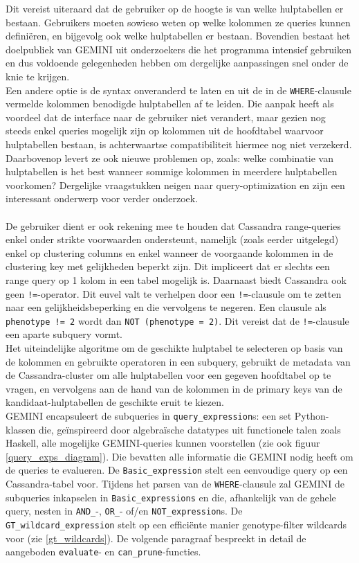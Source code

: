 Dit vereist uiteraard dat de gebruiker op de hoogte is van welke hulptabellen er bestaan. Gebruikers moeten sowieso weten op welke kolommen ze queries kunnen defini\"eren, en bijgevolg ook welke hulptabellen er bestaan. Bovendien bestaat het doelpubliek van GEMINI uit onderzoekers die het programma intensief gebruiken en dus voldoende gelegenheden hebben om dergelijke aanpassingen snel onder de knie te krijgen.\\
Een andere optie is de syntax onveranderd te laten en uit de in de \texttt{WHERE}-clausule vermelde kolommen benodigde hulptabellen af te leiden. Die aanpak heeft als voordeel dat de interface naar de gebruiker niet verandert, maar gezien nog steeds enkel queries mogelijk zijn op kolommen uit de hoofdtabel waarvoor hulptabellen bestaan, is achterwaartse compatibiliteit hiermee nog niet verzekerd. Daarbovenop levert ze ook nieuwe problemen op, zoals: welke combinatie van hulptabellen is het best wanneer sommige kolommen in meerdere hulptabellen voorkomen? Dergelijke vraagstukken neigen naar query-optimization en zijn een interessant onderwerp voor verder onderzoek.\\\\
De gebruiker dient er ook rekening mee te houden dat Cassandra range-queries enkel onder strikte voorwaarden ondersteunt, namelijk (zoals eerder uitgelegd) enkel op clustering columns en enkel wanneer de voorgaande kolommen in de clustering key met gelijkheden beperkt zijn. Dit impliceert dat er slechts een range query op 1 kolom in een tabel mogelijk is. Daarnaast biedt Cassandra ook geen \texttt{!=}-operator. Dit euvel valt te verhelpen door een \texttt{!=}-clausule om te zetten naar een gelijkheidsbeperking en die vervolgens te negeren. Een clausule als \texttt{phenotype != 2} wordt dan \texttt{NOT (phenotype = 2)}. Dit vereist dat de \texttt{!=}-clausule een aparte subquery vormt.\\

Het uiteindelijke algoritme om de geschikte hulptabel te selecteren op basis van de kolommen en gebruikte operatoren in een subquery, gebruikt de metadata van de Cassandra-cluster om alle hulptabellen voor een gegeven hoofdtabel op te vragen, en vervolgens aan de hand van de kolommen in de primary keys van de kandidaat-hulptabellen de geschikte eruit te kiezen.\\

GEMINI encapsuleert de subqueries in \texttt{query\_expression}s: een set Python-klassen die, ge\"inspireerd door algebra\"ische datatypes uit functionele talen zoals Haskell, alle mogelijke GEMINI-queries kunnen voorstellen (zie ook figuur \ref{query_exps_diagram}). Die bevatten alle informatie die GEMINI nodig heeft om de queries te evalueren. De \texttt{Basic\_expression} stelt een eenvoudige query op een Cassandra-tabel voor. Tijdens het parsen van de \texttt{WHERE}-clausule zal GEMINI de subqueries inkapselen in \texttt{Basic\_expressions} en die, afhankelijk van de gehele query, nesten in \texttt{AND\_}-, \texttt{OR\_}- of/en \texttt{NOT\_expression}s. De \texttt{GT\_wildcard\_expression} stelt op een effici\"ente manier genotype-filter wildcards voor (zie \ref{gt_wildcards}). De volgende paragraaf bespreekt in detail de aangeboden \texttt{evaluate}- en \texttt{can\_prune}-functies.

